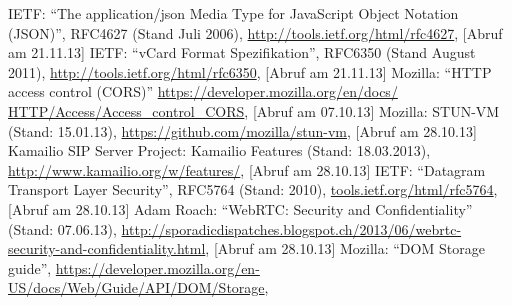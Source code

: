 


















\begin{thebibliography}{literatur}
	 IETF: 
		"`The application/json Media Type for JavaScript Object Notation (JSON)"', RFC4627 (Stand Juli 2006),
		\hyperlink{http://tools.ietf.org/html/rfc4627}{http://tools.ietf.org/html/rfc4627}, 
		[Abruf am 21.11.13]
	 IETF: 
		"`vCard Format Spezifikation"', RFC6350 (Stand August 2011),
		\hyperlink{http://tools.ietf.org/html/rfc6350}{http://tools.ietf.org/html/rfc6350}, 
		[Abruf am 21.11.13]
	 Mozilla: 
		"`HTTP access control (CORS)"' 
		\hyperlink{https://developer.mozilla.org/en/docs/HTTP/Access_control_CORS}{https://developer.mozilla.org/en/docs/
		HTTP/Access/Access\_control\_CORS}, 
		[Abruf am 07.10.13]
	 Mozilla: 
		STUN-VM (Stand: 15.01.13), 
		\hyperlink{https://github.com/mozilla/stun-vm}{https://github.com/mozilla/stun-vm},
		[Abruf am 28.10.13]
	 Kamailio SIP Server Project: 
		Kamailio Features (Stand: 18.03.2013), 
		\hyperlink{http://www.kamailio.org/w/features/}{http://www.kamailio.org/w/features/}, 
		[Abruf am 28.10.13]
	 IETF: 
		"`Datagram Transport Layer Security"', RFC5764 (Stand: 2010), 
		\hyperlink{http://tools.ietf.org/html/rfc5764}{tools.ietf.org/html/rfc5764}, 
		[Abruf am 28.10.13]
	 Adam Roach: 
		"`WebRTC: Security and Confidentiality"' (Stand: 07.06.13), 
		\hyperlink{http://sporadicdispatches.blogspot.ch/2013/06/webrtc-security-and-confidentiality.html}{http://sporadicdispatches.blogspot.ch/2013/06/webrtc-security-and-confidentiality.html}, 
		[Abruf am 28.10.13]
	 Mozilla: 
		"`DOM Storage guide"',
		\hyperlink{https://developer.mozilla.org/en-US/docs/Web/Guide/API/DOM/Storage}{https://developer.mozilla.org/en-US/docs/Web/Guide/API/DOM/Storage},

\end{thebibliography}
